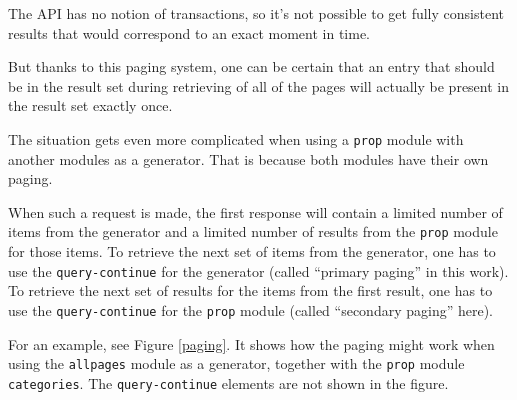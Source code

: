 The API has no notion of transactions, so it's not possible to get fully consistent results
that would correspond to an exact moment in time.

But thanks to this paging system, one can be certain that an entry that should be in the result set
during retrieving of all of the pages will actually be present in the result set exactly once.

The situation gets even more complicated when using a \texttt{prop} module with another modules as a generator.
That is because both modules have their own paging.

When such a request is made, the first response will contain a limited number of items from the generator
and a limited number of results from the \texttt{prop} module for those items.
To retrieve the next set of items from the generator, one has to use the \texttt{query-continue} for the generator
(called ``primary paging'' in this work).
To retrieve the next set of results for the items from the first result,
one has to use the \texttt{query-continue} for the \texttt{prop} module (called ``secondary paging'' here).

For an example, see Figure \ref{paging}.
It shows how the paging might work when using the \texttt{allpages} module as a generator,
together with the \texttt{prop} module \texttt{categories}.
The \texttt{query-continue} elements are not shown in the figure.

